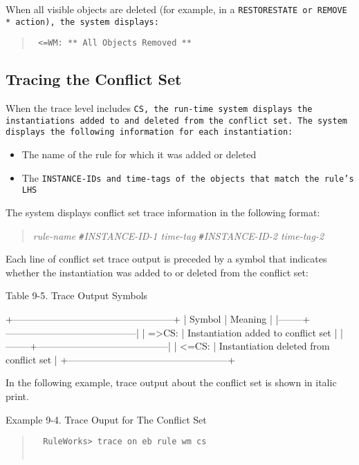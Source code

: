\begin{note}
When all visible objects are deleted (for example, in a
\tt{RESTORESTATE} or \tt{REMOVE *} action), the system displays:

\begin{quote}
\begin{verbatim}
 <=WM: ** All Objects Removed **
\end{verbatim}
\end{quote}

\subsection{Tracing the Conflict Set}

When the trace level includes \tt{CS}, the run-time system displays
the instantiations added to and deleted from the conflict set.  The
system displays the following information for each instantiation:

\begin{itemize}
\item The name of the rule for which it was added or deleted
\item The \tt{INSTANCE-ID}s and time-tags of the objects that match
  the rule's LHS
\end{itemize}

The system displays conflict set trace information in the following
format:

\begin{quote}
  \it{rule-name} \verb|#|\it{INSTANCE-ID-1} \it{time-tag}
  \verb|#|\it{INSTANCE-ID-2} \it{time-tag-2}
\end{quote}

Each line of conflict set trace output is preceded by a symbol that
indicates whether the instantiation was added to or deleted from the
conflict set:

Table 9-5. Trace Output Symbols

+--------------------------------------------------+
| Symbol | Meaning                                 |
|--------+-----------------------------------------|
| =>CS:  | Instantiation added to conflict set     |
|--------+-----------------------------------------|
| <=CS:  | Instantiation deleted from conflict set |
+--------------------------------------------------+

In the following example, trace output about the conflict set is
shown in italic print.

Example 9-4. Trace Ouput for The Conflict Set
\begin{quote}
\begin{verbatim}
  RuleWorks> trace on eb rule wm cs


\end{verbatim}
\end{quote}
\end{note}
